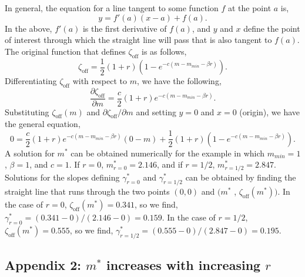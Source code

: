 \documentclass[10pt,letterpaper]{article}
\begin{document}
In general, the equation for a line tangent to some function $f$ at the point $a$ is,
\begin{equation}
y = f'\left(a\right)\left(x-a\right) + f\left(a\right).
\end{equation}
In the above, $f'(a)$ is the first derivative of $f(a)$, and $y$ and $x$ define the point of interest through which the straight line will pass that is also tangent to $f(a)$. The original function that defines $\zeta_{\textrm{off}}$ is as follows,
\begin{equation}
\zeta_{\textrm{off}} = \frac{1}{2}\left(1+r\right)\left(1-e^{-c\left(m-m_{min}-\beta r\right)}\right).
\end{equation}
Differentiating $\zeta_{\textrm{off}}$ with respect to $m$, we have the following,
\begin{equation}
\frac{\partial \zeta_{\textrm{off}}}{\partial m} = \frac{c}{2} \left(1+r\right)e^{-c\left(m-m_{min}-\beta r\right)}.
\end{equation}
Substituting $\zeta_{\textrm{off}}(m)$ and $\partial \zeta_{\textrm{off}} / \partial m$ and setting $y=0$ and $x=0$ (origin), we have the general equation, 
\begin{equation}
0 = \frac{c}{2} \left(1+r\right)e^{-c\left(m-m_{min}-\beta r\right)}\left(0-m\right) + \frac{1}{2}\left(1+r\right)\left(1-e^{-c\left(m-m_{min}-\beta r\right)}\right).
\end{equation}
A solution for $m^{*}$ can be obtained numerically for the example in which $m_{min}=1$, $\beta=1$, and $c=1$. If $r=0$, $m^{*}_{r=0}=2.146$, and if $r=1/2$, $m^{*}_{r=1/2}=2.847$. Solutions for the slopes defining $\gamma^{*}_{r=0}$ and $\gamma^{*}_{r=1/2}$ can be obtained by finding the straight line that runs through the two points $(0,0)$ and $(m^{*}$ , $\zeta_{\textrm{off}}(m^{*}))$. In the case of $r=0$, $\zeta_{\textrm{off}}(m^{*})=0.341$, so we find, $\gamma^{*}_{r=0}=(0.341 - 0)/(2.146 - 0)=0.159$. In the case of $r=1/2$, $\zeta_{\textrm{off}}(m^{*})=0.555$, so we find, $\gamma^{*}_{r=1/2}=(0.555-0)/(2.847-0)=0.195$. 

\subsection*{Appendix 2: $m^{*}$ increases with increasing $r$}
\end{document}
